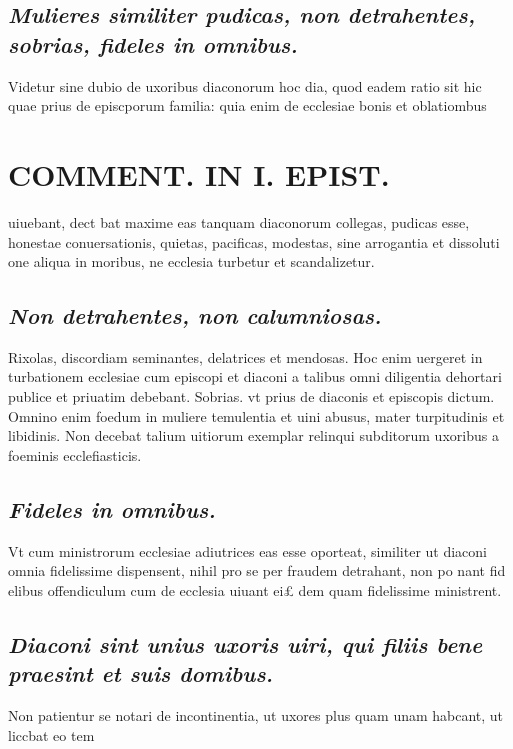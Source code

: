 \documentclass{article}
\begin{document}
\begin{pages}
\subsection*{\textit{Mulieres similiter pudicas, non detrahentes, sobrias, fideles in omnibus. }}\pstart Videtur sine dubio de uxoribus diaconorum hoc dia, quod eadem ratio sit hic quae prius de episcporum familia: quia enim de ecclesiae bonis et oblatiombus  \pend
\section*{COMMENT. IN I. EPIST. }
\marginpar{[ p.84 ]}\pstart uiuebant, dect bat maxime eas tanquam diaconorum collegas, pudicas esse, honestae conuersationis, quietas, pacificas, modestas, sine arrogantia et dissoluti one aliqua in moribus, ne ecclesia turbetur et scandalizetur.  \pend
{}
{}
\subsection*{\textit{Non detrahentes, non calumniosas. }}\pstart Rixolas, discordiam seminantes, delatrices et mendosas. Hoc enim uergeret in turbationem ecclesiae cum episcopi et diaconi a talibus omni diligentia dehortari publice et priuatim debebant.  \pend\pstart Sobrias. vt prius de diaconis et episcopis dictum. Omnino enim foedum in muliere temulentia et uini abusus, mater turpitudinis et libidinis. Non decebat talium uitiorum exemplar relinqui subditorum uxoribus a foeminis ecclefiasticis.  \pend
{}
{}
\subsection*{\textit{Fideles in omnibus. }}\pstart Vt cum ministrorum ecclesiae adiutrices eas esse oporteat, similiter ut diaconi omnia fidelissime dispensent, nihil pro se per fraudem detrahant, non po nant fid elibus offendiculum cum de ecclesia uiuant ei£ dem quam fidelissime ministrent.  \pend
{}
{}
\subsection*{\textit{Diaconi sint unius uxoris uiri, qui filiis bene praesint et suis domibus. }}\pstart Non patientur se notari de incontinentia, ut uxores plus quam unam habcant, ut liccbat eo tem\pend

\end{pages}
\end{document}
